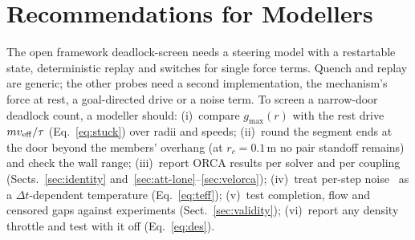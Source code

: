 \section{Recommendations for Modellers}\label{sec:recommend}
The open framework deadlock-screen needs a steering model with a restartable state, deterministic replay and switches for single force terms. Quench and replay are generic; the other probes need a second implementation, the mechanism's force at rest, a goal-directed drive or a noise term. To screen a narrow-door deadlock count, a modeller should: (i)~compare $g_{\max}(r)$ with the rest drive $m v_{\rm eff}/\tau$ (Eq.~\eqref{eq:stuck}) over radii and speeds; (ii)~round the segment ends at the door beyond the members' overhang (at $r_c=0.1$\,m no pair standoff remains) and check the wall range; (iii)~report ORCA results per solver and per coupling (Sects.~\ref{sec:identity} and~\ref{sec:att-lone}--\ref{sec:velorca}); (iv)~treat per-step noise~\cite{xu2021} as a $\Delta t$-dependent temperature (Eq.~\eqref{eq:teff}); (v)~test completion, flow and censored gaps against experiments (Sect.~\ref{sec:validity}); (vi)~report any density throttle and test with it off (Eq.~\eqref{eq:des}).
